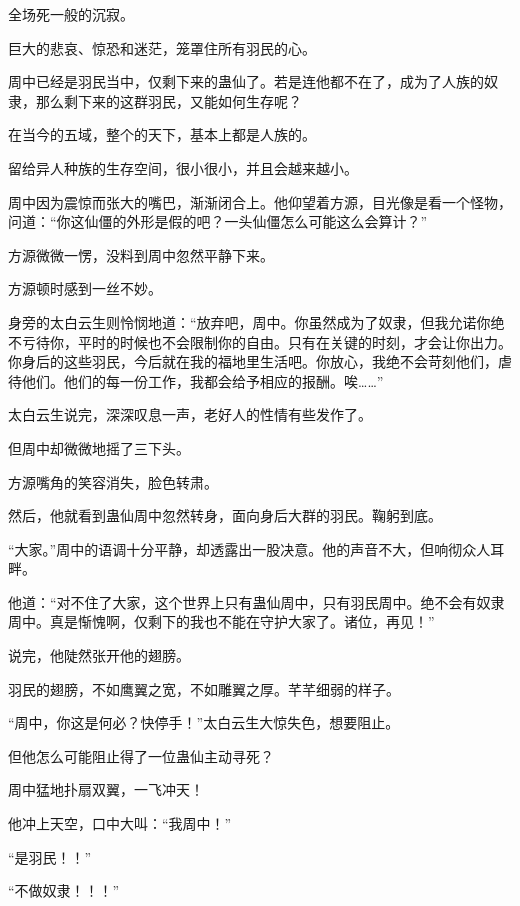 
\begin{this_body}



全场死一般的沉寂。

巨大的悲哀、惊恐和迷茫，笼罩住所有羽民的心。

周中已经是羽民当中，仅剩下来的蛊仙了。若是连他都不在了，成为了人族的奴隶，那么剩下来的这群羽民，又能如何生存呢？

在当今的五域，整个的天下，基本上都是人族的。

留给异人种族的生存空间，很小很小，并且会越来越小。

周中因为震惊而张大的嘴巴，渐渐闭合上。他仰望着方源，目光像是看一个怪物，问道：“你这仙僵的外形是假的吧？一头仙僵怎么可能这么会算计？”

方源微微一愣，没料到周中忽然平静下来。

方源顿时感到一丝不妙。

身旁的太白云生则怜悯地道：“放弃吧，周中。你虽然成为了奴隶，但我允诺你绝不亏待你，平时的时候也不会限制你的自由。只有在关键的时刻，才会让你出力。你身后的这些羽民，今后就在我的福地里生活吧。你放心，我绝不会苛刻他们，虐待他们。他们的每一份工作，我都会给予相应的报酬。唉……”

太白云生说完，深深叹息一声，老好人的性情有些发作了。

但周中却微微地摇了三下头。

方源嘴角的笑容消失，脸色转肃。

然后，他就看到蛊仙周中忽然转身，面向身后大群的羽民。鞠躬到底。

“大家。”周中的语调十分平静，却透露出一股决意。他的声音不大，但响彻众人耳畔。

他道：“对不住了大家，这个世界上只有蛊仙周中，只有羽民周中。绝不会有奴隶周中。真是惭愧啊，仅剩下的我也不能在守护大家了。诸位，再见！”

说完，他陡然张开他的翅膀。

羽民的翅膀，不如鹰翼之宽，不如雕翼之厚。芊芊细弱的样子。

“周中，你这是何必？快停手！”太白云生大惊失色，想要阻止。

但他怎么可能阻止得了一位蛊仙主动寻死？

周中猛地扑扇双翼，一飞冲天！

他冲上天空，口中大叫：“我周中！”

“是羽民！！”

“不做奴隶！！！”


\end{this_body}
